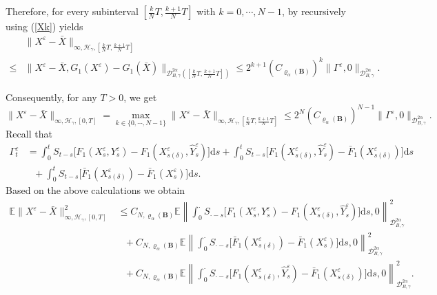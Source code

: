 \documentclass[10pt,a4paper]{article}
\numberwithin{equation}{section}
\begin{document}
Therefore, for every subinterval $[\frac kN T,\frac {k+1}N T]$ with $k=0, \cdots , N-1$, by recursively using (\ref{Xk}) yields
\begin{align}\label{subk}
&\|X^\varepsilon-\bar{X}\|_{\infty,\mathcal H_\gamma,[\frac kN T,\frac {k+1}N T]} \nonumber\\
\leq &\|X^\varepsilon-\bar{X}, G_1(X^\varepsilon)-G_1(\bar{X})\|_{\mathcal{D}_{B,\gamma}^{2\alpha}([\frac kN T,\frac {k+1}N T])}
\leq  2^{k+1} (C_{\varrho_{\alpha}(\mathbf{B})})^k \|\varGamma^\varepsilon,0\|_{\mathcal{D}_{B,\gamma}^{2\alpha}}.
\end{align}


Consequently, for any $T>0$, we get
\begin{equation*}
\|X^\varepsilon-\bar{X}\|_{\infty,\mathcal H_\gamma,[0,T]}=\max_{k\in \{0, \cdots,N-1\}} \|X^\varepsilon-\bar{X}\|_{\infty,\mathcal H_\gamma,[\frac kN T,\frac {k+1}N T]} \leq  2^{N} (C_{\varrho_{\alpha}(\mathbf{B})})^{N-1} \|\varGamma^\varepsilon,0\|_{\mathcal{D}_{B,\gamma}^{2\alpha}}.
\end{equation*}
Recall that
\begin{align*}%
	\varGamma_t^\varepsilon&= \int_0^t S_{t-s} \big[F_1(X_s^\varepsilon,Y_s^\varepsilon)
	-F_1(X_{s(\delta)}^\varepsilon,\hat{Y}_s^\varepsilon) \big]\mathrm{d} s+\int_0^t S_{t-s} \big[F_1(X_{s(\delta)}^\varepsilon,\hat{Y}_s^\varepsilon)-\bar{F}_1(X_{s(\delta)}^\varepsilon) \big]\mathrm{d} s\nonumber\\
	&~~~+\int_0^t S_{t-s} \big[\bar{F}_1(X_{s(\delta)}^\varepsilon)
	-\bar{F}_1(X_s^\varepsilon) \big]\mathrm{d} s.
\end{align*}
Based on the above calculations we obtain
\begin{align}\label{EXdif}
\mathbb E \|X^\varepsilon-\bar{X}\|_{\infty,\mathcal H_\gamma,[0,T]}^2	
& \leq  C_{N,\varrho_{\alpha}(\mathbf{B})} \mathbb E \left\| \displaystyle\int_0^\cdot S_{\cdot-s} \big[F_1(X_s^\varepsilon,Y_s^\varepsilon)
-F_1(X_{s(\delta)}^\varepsilon,\hat{Y}_s^\varepsilon) \big]\mathrm{d} s,0 \right\|_{\mathcal{D}_{B,\gamma}^{2\alpha}}^2 \nonumber\\
&~~~+ C_{N,\varrho_{\alpha}(\mathbf{B})} \mathbb E \left\| \displaystyle\int_0^\cdot S_{\cdot-s} \big[\bar{F}_1(X_{s(\delta)}^\varepsilon)
-\bar{F}_1(X_s^\varepsilon) \big]\mathrm{d} s,0 \right\|_{\mathcal{D}_{B,\gamma}^{2\alpha}}^2 \nonumber\\
&~~~+C_{N,\varrho_{\alpha}(\mathbf{B})} \mathbb E \left\| \displaystyle\int_0^\cdot S_{\cdot-s} \big[F_1(X_{s(\delta)}^\varepsilon,\hat{Y}_s^\varepsilon)-\bar{F}_1(X_{s(\delta)}^\varepsilon) \big]\mathrm{d} s,0 \right\|_{\mathcal{D}_{B,\gamma}^{2\alpha}}^2.
\end{align}
\end{document}
